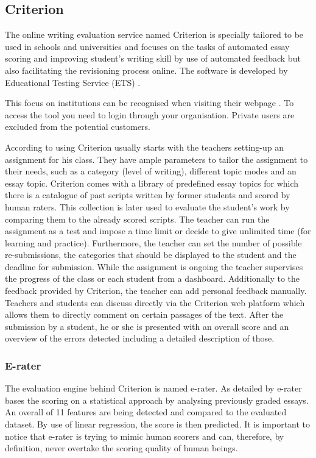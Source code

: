 \documentclass[runningheads]{llncs}
\let\OldTextregistered\textregistered
\renewcommand{\textregistered}{\OldTextregistered\xspace}
\begin{document}
\subsection{Criterion\textregistered}
The online writing evaluation service named Criterion\textregistered is specially tailored to be used in schools and universities and focuses on the tasks of automated essay scoring and improving student's writing skill by use of automated feedback but also facilitating the revisioning process online. The software is developed by Educational Testing Service (ETS) \citep{noauthor_ets_nodate}.

This focus on institutions can be recognised when visiting their webpage \citep{noauthor_ets_nodate}. To access the tool you need to login through your organisation. Private users are excluded from the potential customers. 

According to \textcite{lim_review_2012} using Criterion\textregistered usually starts with the teachers setting-up an assignment for his class. They have ample parameters to tailor the assignment to their needs, such as a category (level of writing), different topic modes and an essay topic. Criterion\textregistered comes with a library of predefined essay topics for which there is a catalogue of past scripts written by former students and scored by human raters. This collection is later used to evaluate the student's work by comparing them to the already scored scripts. The teacher can run the assignment as a test and impose a time limit or decide to give unlimited time (for learning and practice). Furthermore, the teacher can set the number of possible re-submissions, the categories that should be displayed to the student and the deadline for submission. While the assignment is ongoing the teacher supervises the progress of the class or each student from a dashboard. Additionally to the feedback provided by Criterion\textregistered, the teacher can add personal feedback manually. Teachers and students can discuss directly via the Criterion\textregistered web platform which allows them to directly comment on certain passages of the text. After the submission by a student, he or she is presented with an overall score and an overview of the errors detected including a detailed description of those.

\subsubsection{E-rater}
The evaluation engine behind Criterion\textregistered is named e-rater\textregistered. As detailed by \textcite{lim_review_2012} e-rater\textregistered bases the scoring on a statistical approach by analysing previously graded essays. An overall of 11 features are being detected and compared to the evaluated dataset. By use of linear regression, the score is then predicted. It is important to notice that e-rater\textregistered is trying to mimic human scorers and can, therefore, by definition, never overtake the scoring quality of human beings. 
\end{document}
